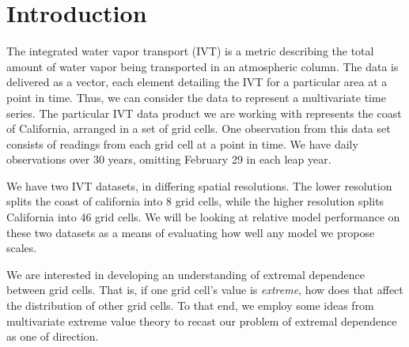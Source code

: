 
\section{Introduction}

 The integrated water vapor transport (IVT) is a metric describing the total amount of water vapor
  being transported in an atmospheric column.  The data is delivered as a vector, each element
  detailing the IVT for a particular area at a point in time.  Thus, we can consider the data to
  represent a multivariate time series.  The particular IVT data product we are working with
  represents the coast of California, arranged in a set of grid cells.  One observation from this
  data set consists of readings from each grid cell at a point in time.  We have daily observations
  over 30 years, omitting February 29 in each leap year.

We have two IVT datasets, in differing spatial resolutions.  The lower resolution splits the coast
  of california into 8 grid cells, while the higher resolution splits California into 46 grid cells.
  We will be looking at relative model performance on these two datasets as a means of evaluating
  how well any model we propose scales.

We are interested in developing an understanding of extremal dependence between grid cells.  That is,
  if one grid cell's value is \emph{extreme}, how does that affect the distribution of other grid
  cells.  To that end, we employ some ideas from multivariate extreme value theory to recast our
  problem of extremal dependence as one of direction.
  
